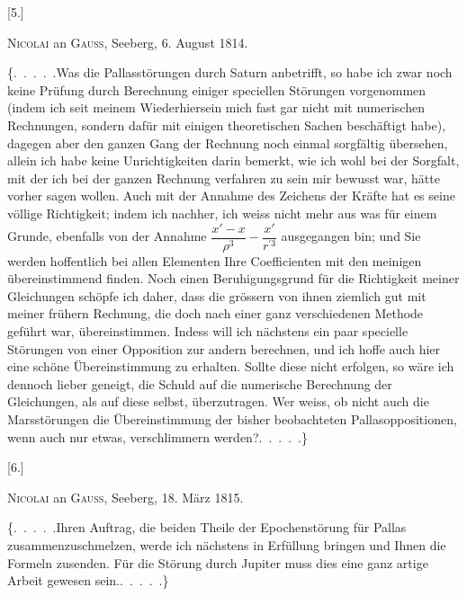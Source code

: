 \clearpage
\begingroup
{}
\renewcommand{\headrulewidth}{0pt}
\par\medskip
{}
\begin{center}
[5.]\par\medskip
\textsc{Nicolai} an \textsc{Gauss}, Seeberg, 6. August 1814.
\end{center}
\par\noindent\hspace*{\parindent}\{.\ .\ .\ .\ .\quad Was die Pallasstörungen durch Saturn anbetrifft, so habe ich
zwar noch keine Prüfung durch Berechnung einiger speciellen Störungen vorgenommen
(indem ich seit meinem Wiederhiersein mich fast gar nicht mit
numerischen Rechnungen, sondern dafür mit einigen theoretischen Sachen beschäftigt
habe), dagegen aber den ganzen Gang der Rechnung noch einmal
sorgfältig übersehen, allein ich habe keine Unrichtigkeiten darin bemerkt, wie
ich wohl bei der Sorgfalt, mit der ich bei der ganzen Rechnung verfahren
zu sein mir bewusst war, hätte vorher sagen wollen. Auch mit der Annahme
des Zeichens der Kräfte hat es seine völlige Richtigkeit; indem ich nachher,
ich weiss nicht mehr aus was für einem Grunde, ebenfalls von der Annahme
\(\dfrac{x'-x}{\rho^3}-\dfrac{x'}{r^{\prime3}}\) ausgegangen bin; und Sie werden hoffentlich bei allen Elementen
Ihre Coefficienten mit den meinigen übereinstimmend finden. Noch einen
Beruhigungsgrund für die Richtigkeit meiner Gleichungen schöpfe ich daher,
dass die grössern von ihnen ziemlich gut mit meiner frühern Rechnung, die
doch nach einer ganz verschiedenen Methode geführt war, übereinstimmen.
Indess will ich nächstens ein paar specielle Störungen von einer Opposition
zur andern berechnen, und ich hoffe auch hier eine schöne Übereinstimmung
zu erhalten. Sollte diese nicht erfolgen, so wäre ich dennoch lieber geneigt,
die Schuld auf die numerische Berechnung der Gleichungen, als auf diese
selbst, überzutragen. Wer weiss, ob nicht auch die Marsstörungen die Übereinstimmung
der bisher beobachteten Pallasoppositionen, wenn auch nur etwas,
verschlimmern werden?\quad .\ .\ .\ .\ .\}

\par\medskip
{}
\begin{center}
[6.]\par\medskip
\textsc{Nicolai} an \textsc{Gauss}, Seeberg, 18. März 1815.
\end{center}
\par\noindent\hspace*{\parindent}\{.\ .\ .\ .\ .\quad Ihren Auftrag, die beiden Theile der Epochenstörung für Pallas
zusammenzuschmelzen, werde ich nächstens in Erfüllung bringen und Ihnen
die Formeln zusenden. Für die Störung durch Jupiter muss dies eine ganz
artige Arbeit gewesen sein.\quad .\ .\ .\ .\ .\}

